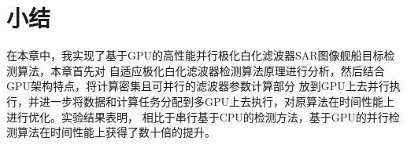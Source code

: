 \section{小结}
  在本章中，我实现了基于GPU的高性能并行极化白化滤波器SAR图像舰船目标检测算法，本章首先对
  自适应极化白化滤波器检测算法原理进行分析，然后结合GPU架构特点，将计算密集且可并行的滤波器参数计算部分
  放到GPU上去并行执行，并进一步将数据和计算任务分配到多GPU上去执行，对原算法在时间性能上进行优化。实验结果表明，
  相比于串行基于CPU的检测方法，基于GPU的并行检测算法在时间性能上获得了数十倍的提升。


